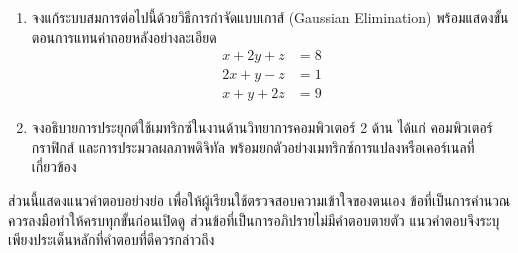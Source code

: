 \begin{enumerate}
    \item จงแก้ระบบสมการต่อไปนี้ด้วยวิธีการกำจัดแบบเกาส์ (Gaussian Elimination) พร้อมแสดงขั้นตอนการแทนค่าถอยหลังอย่างละเอียด
    \[
    \begin{aligned}
    x + 2y + z &= 8 \\
    2x + y - z &= 1 \\
    x + y + 2z &= 9
    \end{aligned}
    \]
    \item จงอธิบายการประยุกต์ใช้เมทริกซ์ในงานด้านวิทยาการคอมพิวเตอร์ 2 ด้าน ได้แก่ คอมพิวเตอร์กราฟิกส์ และการประมวลผลภาพดิจิทัล พร้อมยกตัวอย่างเมทริกซ์การแปลงหรือเคอร์เนลที่เกี่ยวข้อง
\end{enumerate}

ส่วนนี้แสดงแนวคำตอบอย่างย่อ เพื่อให้ผู้เรียนใช้ตรวจสอบความเข้าใจของตนเอง ข้อที่เป็นการคำนวณควรลงมือทำให้ครบทุกขั้นก่อนเปิดดู ส่วนข้อที่เป็นการอภิปรายไม่มีคำตอบตายตัว แนวคำตอบจึงระบุเพียงประเด็นหลักที่คำตอบที่ดีควรกล่าวถึง

